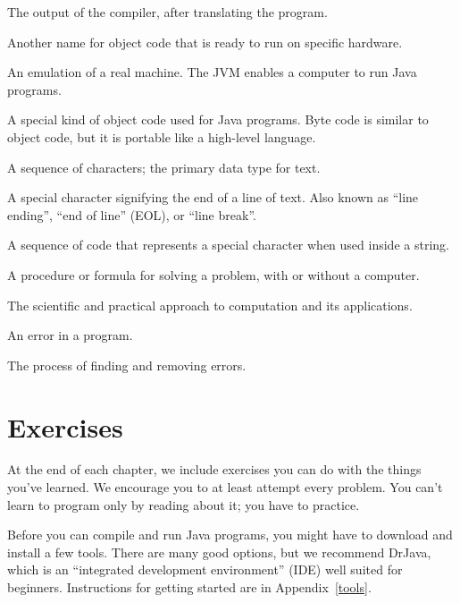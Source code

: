 \begin{description}
The output of the compiler, after translating the program.

Another name for object code that is ready to run on specific hardware.

An emulation of a real machine. The JVM enables a computer to run Java programs.

A special kind of object code used for Java programs.
Byte code is similar to object code, but it is portable like a high-level language.

A sequence of characters; the primary data type for text.

A special character signifying the end of a line of text.
Also known as ``line ending'', ``end of line'' (EOL), or ``line break''.


A sequence of code that represents a special character when used inside a string.

A procedure or formula for solving a problem, with or without a computer.

The scientific and practical approach to computation and its applications.

An error in a program.

The process of finding and removing errors.

\end{description}


\section{Exercises}

At the end of each chapter, we include exercises you can do with the things you've learned.
We encourage you to at least attempt every problem.
You can't learn to program only by reading about it; you have to practice.

Before you can compile and run Java programs, you might have to download and install a few tools.
There are many good options, but we recommend DrJava, which is an ``integrated development environment'' (IDE) well suited for beginners.
Instructions for getting started are in Appendix~\ref{tools}.

